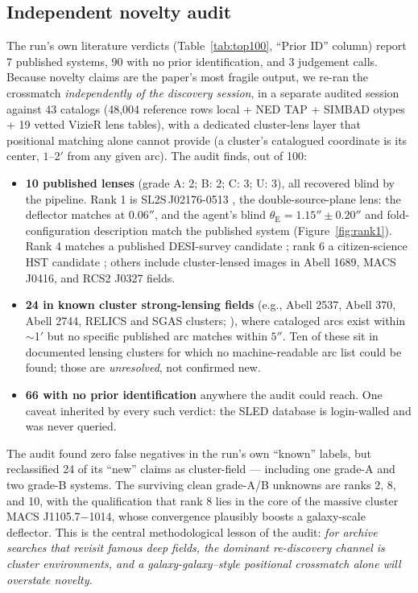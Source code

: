 \documentclass[11pt,letterpaper]{article}
\newcommand{\thetaE}{\ensuremath{\theta_{\mathrm{E}}}}
\begin{document}
\subsection{Independent novelty audit}\label{sec:results-xmatch}

The run's own literature verdicts (Table~\ref{tab:top100}, ``Prior ID''
column) report 7 published systems, 90 with no prior identification, and 3
judgement calls. Because novelty claims are the paper's most fragile output,
we re-ran the crossmatch \emph{independently of the discovery session}, in a
separate audited session against 43 catalogs (48{,}004 reference rows local +
NED TAP + SIMBAD otypes + 19 vetted VizieR lens tables), with a dedicated
cluster-lens layer that positional matching alone cannot provide (a cluster's
catalogued coordinate is its center, $1$--$2'$ from any given arc). The audit
finds, out of 100:

\begin{itemize}
  \item \textbf{10 published lenses} (grade A: 2; B: 2; C: 3; U: 3), all
    recovered blind by the pipeline. Rank 1 is SL2S\,J02176-0513
    \citep{cabanac2007sl2s,tu2009sl2s}, the double-source-plane lens: the
    deflector matches at $0.06''$, and the agent's blind
    $\thetaE=1.15''\pm0.20''$ and fold-configuration description match the
    published system (Figure~\ref{fig:rank1}). Rank 4 matches a published
    DESI-survey candidate \citep{inchausti2025strong}; rank 6 a
    citizen-science HST candidate \citep{garvin2022hubble}; others include
    cluster-lensed images in Abell 1689, MACS J0416, and RCS2 J0327 fields.
  \item \textbf{24 in known cluster strong-lensing fields} (e.g., Abell 2537,
    Abell 370, Abell 2744, RELICS and SGAS clusters;
    \citealt{coe2019relics}), where cataloged arcs exist within $\sim$1$'$
    but no specific published arc matches within $5''$. Ten of these sit in
    documented lensing clusters for which no machine-readable arc list could
    be found; those are \emph{unresolved}, not confirmed new.
  \item \textbf{66 with no prior identification} anywhere the audit could
    reach. One caveat inherited by every such verdict: the SLED database is
    login-walled and was never queried.
\end{itemize}

The audit found zero false negatives in the run's own ``known'' labels, but
reclassified 24 of its ``new'' claims as cluster-field --- including one
grade-A and two grade-B systems. The surviving clean grade-A/B unknowns are
ranks 2, 8, and 10, with the qualification that rank 8 lies in the core of the
massive cluster MACS J1105.7$-$1014, whose convergence plausibly boosts a
galaxy-scale deflector. This is the central methodological lesson of the
audit: \emph{for archive searches that revisit famous deep fields, the
dominant re-discovery channel is cluster environments, and a
galaxy-galaxy--style positional crossmatch alone will overstate novelty.}
\end{document}
